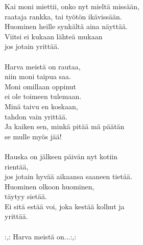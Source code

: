 
Kai moni miettii, onko nyt mieltä missään, \\ raataja rankka, tai työtön ikävissään. \\ Huominen heille synkältä aina näyttää. \\ Viitsi ei kukaan lähteä mukaan \\ jos jotain yrittää. \\ \hspace{10mm} \\ Harva meistä on rautaa, \\ niin moni taipua saa. \\ Moni omillaan oppinut \\ ei ole toimeen tulemaan. \\ Minä taivu en koskaan, \\ tahdon vain yrittää. \\ Ja kaiken sen, minkä pitää mä päätän \\ se mulle myös jää! \\ \hspace{10mm} \\ Hauska on jälkeen päivän nyt kotiin \\ rientää, \\ jos jotain hyvää aikaansa saaneen tietää. \\ Huominen olkoon huominen, \\ täytyy sietää. \\ Ei sitä estää voi, joka kestää kolhut ja \\ yrittää. \\ \hspace{10mm} \\ :,: Harva meistä on...:,: